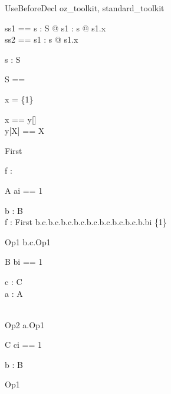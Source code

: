 \begin{zsection}
  \SECTION UseBeforeDecl \parents oz\_toolkit, standard\_toolkit
\end{zsection}

\begin{zed}
 ss1 == \mu s : S @ \mu s1 : s @ s1.x\\
 ss2 == \mu s1 : s @ s1.x\\
\end{zed}

\begin{axdef}
  s : S \\
\end{axdef}

\begin{zed}
 S == \\
\end{zed}

\begin{axdef}
\where
  x = \{1\}
\end{axdef}

\begin{zed}
   x == y[\nat]\\
   y[X] == X
\end{zed}

\begin{class}{First}
 \begin{state}
  f : \nat
 \end{state}
\end{class}

\begin{class}{A}
  ai == 1\\
  \begin{state}
   b : B\\
   f : First
  \where
    b.c.b.c.b.c.b.c.b.c.b.c.b.c.b.c.b.bi \in \{1\}\\
  \end{state}
  Op1 \sdef b.c.Op1 \land [x? : \nat]\\
\end{class}

\begin{class}{B}
  bi == 1\\
  \begin{state}
   c : C\\
   a : A
  \end{state}\\
  Op2 \sdef a.Op1 \land [x? : \nat]
\end{class}

\begin{class}{C}
  ci == 1\\
  \begin{state}
    b : B
  \end{state}
  Op1 \sdef [x? :  \nat]
\end{class}


